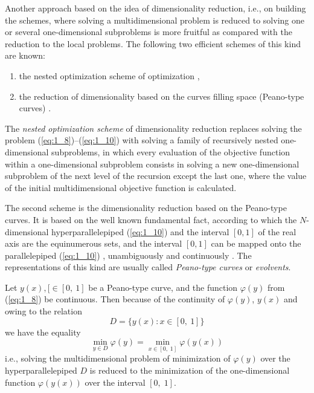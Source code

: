 Another approach based on the idea of dimensionality reduction, i.e., on building the schemes, where solving a multidimensional problem is reduced to solving one or several one-dimensional subproblems is more fruitful as compared with the reduction to the local problems. The following two efficient schemes of this kind are known:
\begin{enumerate}
\item{the nested optimization scheme  of optimization \cite{1_CarrHowe, 1_Evtushenko, 1_GerGriIsr, 1_GerGriGer, 1_GriIsrAIP, 1_GriIsrSerg, 1_GriIsrCEUR, 1_Piyavskij, 1_SergGriJCAA, 1_ShiOlaf, 1_StrMonRus, 1_StrSergMon2000, 1_vanDam},}
\item{the reduction of dimensionality based on the curves filling 
space (Peano-type curves) \cite{1_Butz, 1_Goertzel, 1_HimOliPet, 1_LeraSergCNSNS, 1_LeraSergANM, 1_SergStrLeraMonogr, 1_StrMonRus,1_StrSergMon2000}.}
\end{enumerate}
The \textit{nested optimization scheme} of dimensionality reduction replaces solving the problem (\ref{eq:1_8})--(\ref{eq:1_10}) with solving a family of recursively nested one-dimensional subproblems, in which every evaluation of the objective function within a one-dimensional subproblem consists in solving a new one-dimensional subproblem of the next level of the recursion except the last one, where the value of the initial multidimensional objective function is calculated. 

The second scheme is the dimensionality reduction based on the Peano-type curves. It is based on the well known fundamental fact, according to which the $N$-dimensional hyperparallelepiped (\ref{eq:1_10}) and the interval $[0,1]$ of the real axis are the equinumerous sets, and the interval $[0,1]$ can be mapped onto the parallelepiped (\ref{eq:1_10}) , unambiguously and continuously \cite{1_SergStrLeraMonogr, 1_StrSergMon2000}. The representations of this kind are usually called \textit{Peano-type curves} or \textit{evolvents}. 

Let $y(x),[\in [0,\:1]$  be a Peano-type curve, and the function  $\varphi(y)$ from (\ref{eq:1_8}) be continuous. Then because of the continuity of  $\varphi(y)$, $y(x)$ and owing to the relation
\begin{displaymath}
D=\{y(x):x\in [0,\:1]\} 
\end{displaymath}
we have the equality
\begin{displaymath}
\min_{y\in D}\varphi(y)=\min_{x\in [0,\;1]}\varphi(y(x)) 
\end{displaymath}
i.e., solving the multidimensional problem of minimization of $\varphi(y)$ over the hyperparallelepiped $D$ is reduced to the minimization of the one-dimensional function $\varphi(y(x))$ over the interval $[0,\;1]$.

